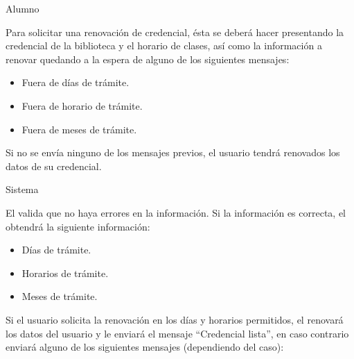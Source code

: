 \begin{PDescripcion}

  \Ppaso Alumno

    \begin{enumerate}

      \Ppaso[\itarea]   Para solicitar una renovación de credencial, ésta se deberá hacer presentando la credencial de la biblioteca y el horario de clases, así como la información a renovar quedando a la espera de alguno de los siguientes mensajes:

      \begin{itemize}
        \item Fuera de días de trámite.
        \item Fuera de horario de trámite.
        \item Fuera de meses de trámite.
      \end{itemize}

      Si no se envía ninguno de los mensajes previos, el usuario tendrá renovados los datos de su credencial.

    \end{enumerate}

  \Ppaso Sistema

    \begin{enumerate}

      \Ppaso[\itarea]  El  valida que no haya errores en la información. Si la información es correcta, el  obtendrá la siguiente información:

      \begin{itemize}
        \item Días de trámite.
        \item Horarios de trámite.
        \item Meses de trámite.
      \end{itemize}

      Si el usuario solicita la renovación en los días y horarios permitidos, el  renovará los datos del usuario y le enviará el mensaje “Credencial lista”, en caso contrario enviará alguno de los siguientes mensajes (dependiendo del caso):


\end{enumerate}
\end{PDescripcion}
